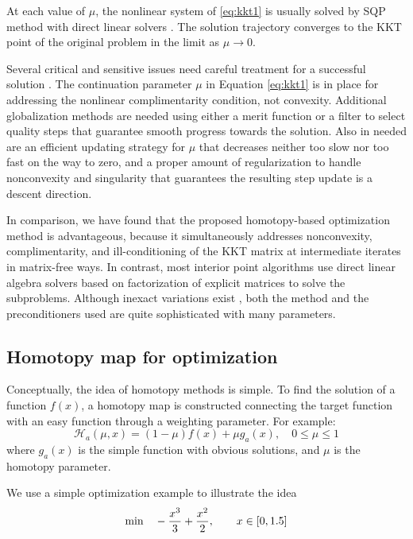 \documentclass{article}
\theoremstyle{definition}
\begin{document}
At each value of $\mu$, the nonlinear system of \eqref{eq:kkt1} is usually solved by SQP method with direct linear solvers \cite{Byrd:1999:IPA:588897.589167}. The solution trajectory converges to the KKT point of the original problem in the limit as $\mu \rightarrow 0$. 

Several critical and sensitive issues need careful treatment for a successful solution \cite{Nocedal2006NO}. The continuation parameter $\mu$ in Equation \eqref{eq:kkt1} is in place for addressing the nonlinear complimentarity condition, not convexity. Additional globalization methods are needed using either a merit function or a filter to select quality steps that guarantee smooth progress towards the solution. Also in needed are an efficient updating strategy for $\mu$ that decreases neither too slow nor too fast on the way to zero, and a proper amount of regularization to handle nonconvexity and singularity that guarantees the resulting step update is a descent direction. 

In comparison, we have found that the proposed homotopy-based optimization method is advantageous, because it simultaneously addresses nonconvexity, complimentarity, and ill-conditioning of the KKT matrix at intermediate iterates in matrix-free ways. In contrast, most interior point algorithms use direct linear algebra solvers based on factorization of explicit matrices to solve the subproblems. Although inexact variations exist \cite{Gondzio2012}, both the method and the preconditioners used are quite sophisticated with many parameters.

\subsection{Homotopy map for optimization}
Conceptually, the idea of homotopy methods is simple. To find the solution of a function $f(x)$, a homotopy map is constructed connecting the target function with an easy function through a weighting parameter. For example:
\begin{equation*}
\mathcal{H}_a\left(\mu, x\right) = (1-\mu) f(x) + \mu g_a(x), \quad 0 \leq \mu \leq 1
\end{equation*}
where $g_a(x)$ is the simple function with obvious solutions, and $\mu$ is the homotopy parameter. 

We use a simple optimization example to illustrate the idea
\begin{equation*}
\text{min}  \quad -\frac{x^3}{3} + \frac{x^2}{2},  \qquad  x \in [0, 1.5]\\
\end{equation*}
\end{document}
